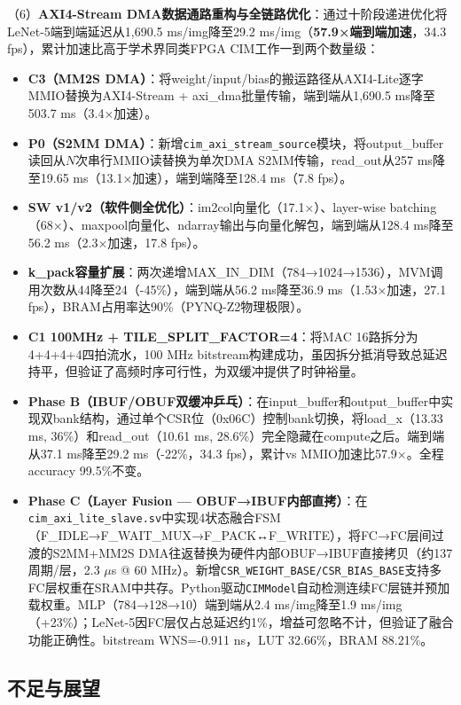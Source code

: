\documentclass[12pt, a4paper]{article}
\begin{document}
（6）\textbf{AXI4-Stream DMA数据通路重构与全链路优化}：通过十阶段递进优化将LeNet-5端到端延迟从1,690.5 ms/img降至29.2 ms/img（\textbf{57.9×端到端加速}，34.3 fps），累计加速比高于学术界同类FPGA CIM工作一到两个数量级：
\begin{itemize}
    \item \textbf{C3（MM2S DMA）}：将weight/input/bias的搬运路径从AXI4-Lite逐字MMIO替换为AXI4-Stream + axi\_dma批量传输，端到端从1,690.5 ms降至503.7 ms（3.4×加速）。
    \item \textbf{P0（S2MM DMA）}：新增\texttt{cim\_axi\_stream\_source}模块，将output\_buffer读回从$N$次串行MMIO读替换为单次DMA S2MM传输，read\_out从257 ms降至19.65 ms（13.1×加速），端到端降至128.4 ms（7.8 fps）。
    \item \textbf{SW v1/v2（软件侧全优化）}：im2col向量化（17.1×）、layer-wise batching（68×）、maxpool向量化、ndarray输出与向量化解包，端到端从128.4 ms降至56.2 ms（2.3×加速，17.8 fps）。
    \item \textbf{k\_pack容量扩展}：两次递增MAX\_IN\_DIM（784→1024→1536），MVM调用次数从44降至24（-45\%），端到端从56.2 ms降至36.9 ms（1.53×加速，27.1 fps），BRAM占用率达90\%（PYNQ-Z2物理极限）。
    \item \textbf{C1 100MHz + TILE\_SPLIT\_FACTOR=4}：将MAC 16路拆分为4+4+4+4四拍流水，100 MHz bitstream构建成功，虽因拆分抵消导致总延迟持平，但验证了高频时序可行性，为双缓冲提供了时钟裕量。
    \item \textbf{Phase B（IBUF/OBUF双缓冲乒乓）}：在input\_buffer和output\_buffer中实现双bank结构，通过单个CSR位（0x06C）控制bank切换，将load\_x（13.33 ms, 36\%）和read\_out（10.61 ms, 28.6\%）完全隐藏在compute之后。端到端从37.1 ms降至29.2 ms（-22\%，34.3 fps），累计vs MMIO加速比57.9×。全程accuracy 99.5\%不变。
    \item \textbf{Phase C（Layer Fusion — OBUF→IBUF内部直拷）}：在\texttt{cim\_axi\_lite\_slave.sv}中实现4状态融合FSM（F\_IDLE→F\_WAIT\_MUX→F\_PACK↔F\_WRITE），将FC→FC层间过渡的S2MM+MM2S DMA往返替换为硬件内部OBUF→IBUF直接拷贝（约137周期/层，2.3 $\mu$s @ 60 MHz）。新增\texttt{CSR\_WEIGHT\_BASE/CSR\_BIAS\_BASE}支持多FC层权重在SRAM中共存。Python驱动\texttt{CIMModel}自动检测连续FC层链并预加载权重。MLP（784→128→10）端到端从2.4 ms/img降至1.9 ms/img（+23\%）；LeNet-5因FC层仅占总延迟约1\%，增益可忽略不计，但验证了融合功能正确性。bitstream WNS=-0.911 ns，LUT 32.66\%，BRAM 88.21\%。
\end{itemize}

\subsection{不足与展望}
\label{sec:future_work}
\end{document}
